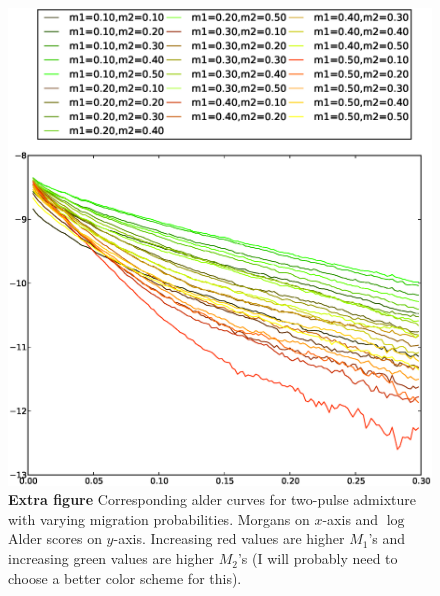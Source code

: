 \begin{figure}
\includegraphics[scale=.6]{alder_ms.eps}
\caption{
{\bf Extra figure} Corresponding alder curves for two-pulse admixture with varying migration probabilities. Morgans on $x$-axis and $\log$ Alder scores on $y$-axis. Increasing red values are higher $M_1$'s and increasing green values are higher $M_2$'s  (I will probably need to choose a better color scheme for this).
}
\end{figure}


